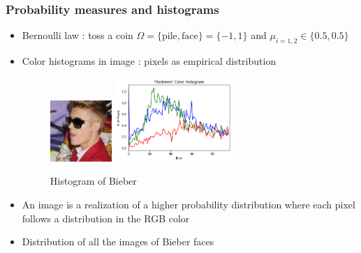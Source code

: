 \documentclass[french,9pt]{beamer}
\begin{document}

\begin{frame}
\frametitle{Probability measures and histograms}

\begin{itemize}
\item Bernoulli law : toss a coin $\Omega=\{\text{pile},\text{face}\}=\{-1,1\}$ and $\mu_{i=1,2} \in \{0.5,0.5\}$
\item Color histograms in image : pixels as empirical distribution
\begin{figure}
  \begin{center}
    \includegraphics[width=0.22\textwidth]{fig/biber.png}\hspace{1mm}
     \includegraphics[width=0.42\textwidth]{fig/hist_biber.png}
  \end{center}
 \caption{Histogram of Bieber}
\end{figure}
\item An image is a realization of a higher probability distribution where each pixel follows a distribution in the RGB color
\item Distribution of all the images of Bieber faces 
\end{itemize}
\end{frame}

\end{document}
